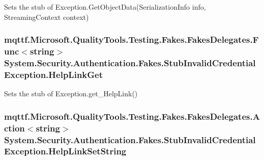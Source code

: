 Sets the stub of Exception.\-Get\-Object\-Data(\-Serialization\-Info info, Streaming\-Context context)

\hypertarget{class_system_1_1_security_1_1_authentication_1_1_fakes_1_1_stub_invalid_credential_exception_ac9b7deaf429c29d5bc35dec0abd49c72}{
\subsubsection[{Help\-Link\-Get}]{\setlength{\rightskip}{0pt plus 5cm}mqttf.\-Microsoft.\-Quality\-Tools.\-Testing.\-Fakes.\-Fakes\-Delegates.\-Func$<$string$>$ System.\-Security.\-Authentication.\-Fakes.\-Stub\-Invalid\-Credential\-Exception.\-Help\-Link\-Get}}\label{class_system_1_1_security_1_1_authentication_1_1_fakes_1_1_stub_invalid_credential_exception_ac9b7deaf429c29d5bc35dec0abd49c72}


Sets the stub of Exception.\-get\-\_\-\-Help\-Link()

\hypertarget{class_system_1_1_security_1_1_authentication_1_1_fakes_1_1_stub_invalid_credential_exception_af25400ae935ffd22224ddd1111710159}{
\subsubsection[{Help\-Link\-Set\-String}]{\setlength{\rightskip}{0pt plus 5cm}mqttf.\-Microsoft.\-Quality\-Tools.\-Testing.\-Fakes.\-Fakes\-Delegates.\-Action$<$string$>$ System.\-Security.\-Authentication.\-Fakes.\-Stub\-Invalid\-Credential\-Exception.\-Help\-Link\-Set\-String}}\label{class_system_1_1_security_1_1_authentication_1_1_fakes_1_1_stub_invalid_credential_exception_af25400ae935ffd22224ddd1111710159}


